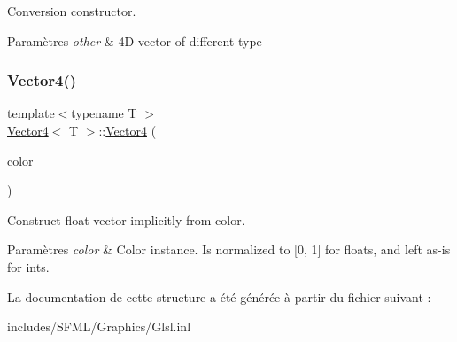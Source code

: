 Conversion constructor. 


\begin{DoxyParams}{Paramètres}
{\em other} & 4D vector of different type \\
\hline
\end{DoxyParams}
\mbox{\label{structVector4_af1da65a743ddbb5c779b41eae766c00d}} 
\subsubsection{\texorpdfstring{Vector4()}{Vector4()}\hspace{0.1cm}{\footnotesize\ttfamily [3/3]}}
{\footnotesize\ttfamily template$<$typename T $>$ \\
\hyperlink{structVector4}{Vector4}$<$ T $>$\+::\hyperlink{structVector4}{Vector4} (\begin{DoxyParamCaption}\item[{const Color \&}]{color }\end{DoxyParamCaption})\hspace{0.3cm}{\ttfamily [inline]}}



Construct float vector implicitly from color. 


\begin{DoxyParams}{Paramètres}
{\em color} & Color instance. Is normalized to \mbox{[}0, 1\mbox{]} for floats, and left as-\/is for ints. \\
\hline
\end{DoxyParams}


La documentation de cette structure a été générée à partir du fichier suivant \+:\begin{DoxyCompactItemize}
\item 
includes/\+S\+F\+M\+L/\+Graphics/Glsl.\+inl\end{DoxyCompactItemize}
